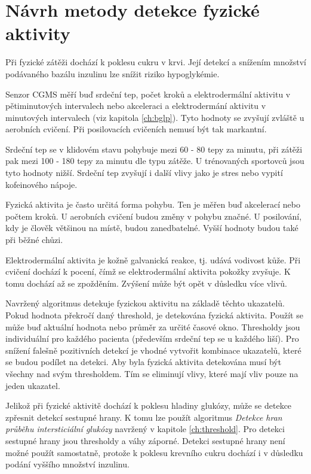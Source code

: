 \chapter{Návrh metody detekce fyzické aktivity}

Při fyzické zátěži dochází k poklesu cukru v krvi. Její detekcí a snížením množství podávaného bazálu inzulinu lze snížit riziko hypoglykémie.

Senzor CGMS měří buď srdeční tep, počet kroků a elektrodermální aktivitu v pětiminutových intervalech nebo akceleraci a elektrodermání aktivitu v minutových intervalech (viz kapitola \ref{ch:bglp}). Tyto hodnoty se zvyšují zvláště u aerobních cvičení. Při posilovacích cvičeních nemusí být tak markantní.

Srdeční tep se v klidovém stavu pohybuje mezi 60 - 80 tepy za minutu, při zátěži pak mezi 100 - 180 tepy za minutu dle typu zátěže. U trénovaných sportovců jsou tyto hodnoty nižší. Srdeční tep zvyšují i další vlivy jako je stres nebo vypití kofeinového nápoje.

Fyzická aktivita je často určitá forma pohybu. Ten je měřen buď akcelerací nebo počtem kroků. U aerobních cvičení budou změny v pohybu značné. U posilování, kdy je člověk většinou na místě, budou zanedbatelné. Vyšší hodnoty budou také při běžné chůzi.

Elektrodermální aktivita je kožně galvanická reakce, tj. udává vodivost kůže. Při cvičení dochází k pocení, čímž se elektrodermální aktivita pokožky zvyšuje. K tomu dochází až se zpožděním. Zvýšení může být opět v důsledku více vlivů.

Navržený algoritmus detekuje fyzickou aktivitu na základě těchto ukazatelů. Pokud hodnota překročí daný threshold, je detekována fyzická aktivita. Použít se může buď aktuální hodnota nebo průměr za určité časové okno. Thresholdy jsou individuální pro každého pacienta (především srdeční tep se u každého liší).  Pro snížení falešně pozitivních detekcí je vhodné vytvořit kombinace ukazatelů, které se budou podílet na detekci. Aby byla fyzická aktivita detekována musí být všechny nad svým thresholdem. Tím se eliminují vlivy, které mají vliv pouze na jeden ukazatel.

Jelikož při fyzické aktivitě dochází k poklesu hladiny glukózy, může se detekce zpřesnit detekcí sestupné hrany. K tomu lze použít algoritmus \textit{Detekce hran průběhu intersticiální glukózy} navržený v kapitole \ref{ch:threshold}. Pro detekci sestupné hrany jsou thresholdy a váhy záporné. Detekci sestupné hrany není možné použít samostatně, protože k poklesu krevního cukru dochází i v důsledku podání vyššího množství inzulinu.\enlargethispage{\baselineskip} %